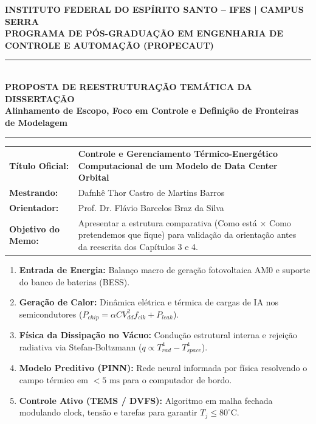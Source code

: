 \documentclass[11pt,a4paper]{article}
\begin{document}
\begin{center}
    {\small\textbf{INSTITUTO FEDERAL DO ESPÍRITO SANTO -- IFES | CAMPUS SERRA}}\\[2pt]
    {\small\textbf{PROGRAMA DE PÓS-GRADUAÇÃO EM ENGENHARIA DE CONTROLE E AUTOMAÇÃO (PROPECAUT)}}\\[6pt]
    \rule{\textwidth}{1.2pt}\\[6pt]
    {\large\textbf{\color{ifesgreen}PROPOSTA DE REESTRUTURAÇÃO TEMÁTICA DA DISSERTAÇÃO}}\\[3pt]
    {\small\textbf{Alinhamento de Escopo, Foco em Controle e Definição de Fronteiras de Modelagem}}\\[4pt]
    \rule{\textwidth}{0.6pt}
\end{center}

\vspace{-6pt}
\begin{center}
    \begin{tabularx}{\textwidth}{lX}
        \textbf{Título Oficial:} & \textbf{Controle e Gerenciamento Térmico-Energético Computacional de um Modelo de Data Center Orbital} \\
        \textbf{Mestrando:} & Dafnhê Thor Castro de Martins Barros \\
        \textbf{Orientador:} & Prof. Dr. Flávio Barcelos Braz da Silva \\
        \textbf{Objetivo do Memo:} & Apresentar a estrutura comparativa (Como está $\times$ Como pretendemos que fique) para validação da orientação antes da reescrita dos Capítulos 3 e 4.
    \end{tabularx}
\end{center}

\vspace{4pt}

\begin{tcolorbox}[colback=boxheader, colframe=ifesgreen, title=\color{ifesgreen}\textbf{DIRETRIZ CENTRAL: OS 5 PILARES DA DISSERTAÇÃO ENXUTA}]
\small
\begin{enumerate}[leftmargin=1.5em, itemsep=1pt, parsep=0pt]
    \item \textbf{Entrada de Energia:} Balanço macro de geração fotovoltaica AM0 e suporte do banco de baterias (BESS).
    \item \textbf{Geração de Calor:} Dinâmica elétrica e térmica de cargas de IA nos semicondutores ($P_{chip} = \alpha C V_{dd}^2 f_{clk} + P_{leak}$).
    \item \textbf{Física da Dissipação no Vácuo:} Condução estrutural interna e rejeição radiativa via Stefan-Boltzmann ($q \propto T_{rad}^4 - T_{space}^4$).
    \item \textbf{Modelo Preditivo (PINN):} Rede neural informada por física resolvendo o campo térmico em $<5\text{ ms}$ para o computador de bordo.
    \item \textbf{Controle Ativo (TEMS / DVFS):} Algoritmo em malha fechada modulando clock, tensão e tarefas para garantir $T_j \le 80^\circ\text{C}$.
\end{enumerate}
\end{tcolorbox}
\end{document}
